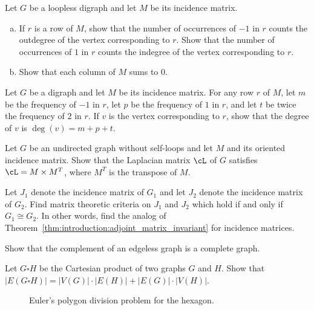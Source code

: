 \begin{problem}
\item Let $G$ be a loopless digraph and let $M$ be its incidence
  matrix.
  \begin{enumerate}[(a)]
  \item If $r$ is a row of $M$, show that the number of occurrences of
    $-1$ in $r$ counts the outdegree of the vertex corresponding to
    $r$. Show that the number of occurrences of $1$ in $r$ counts the
    indegree of the vertex corresponding to $r$.

  \item Show that each column of $M$ sums to $0$.
  \end{enumerate}

\item Let $G$ be a digraph and let $M$ be its incidence matrix. For
  any row $r$ of $M$, let $m$ be the frequency of $-1$ in $r$, let
  $p$ be the frequency of $1$ in $r$, and let $t$ be twice the
  frequency of $2$ in $r$. If $v$ is the vertex corresponding to
  $r$, show that the degree of $v$ is $\deg(v) = m + p + t$.

\item Let $G$ be an undirected graph without self-loops and let $M$
  and its oriented incidence matrix. Show that the Laplacian matrix
  $\cL$ of $G$ satisfies $\cL = M \times M^T$, where
  $M^T$ is the transpose of $M$.

\item Let $J_1$ denote the incidence matrix of $G_1$ and let $J_2$
  denote the incidence matrix of $G_2$. Find matrix theoretic criteria
  on $J_1$ and $J_2$ which hold if and only if $G_1 \cong G_2$. In
  other words, find the analog of
  Theorem~\ref{thm:introduction:adjoint_matrix_invariant} for
  incidence matrices.

\item Show that the complement of an edgeless graph is a complete
  graph.

\item Let $G \square H$ be the Cartesian product of two graphs $G$ and
  $H$. Show that
  $|E(G \square H)| = |V(G)| \cdot |E(H)| + |E(G)| \cdot |V(H)|$.

\begin{figure}[!htbp]
\centering
{}

\caption{Euler's polygon division problem for the hexagon.}
\label{fig:introduction:Euler_polygon_division_hexagon}
\end{figure}


\end{problem}
